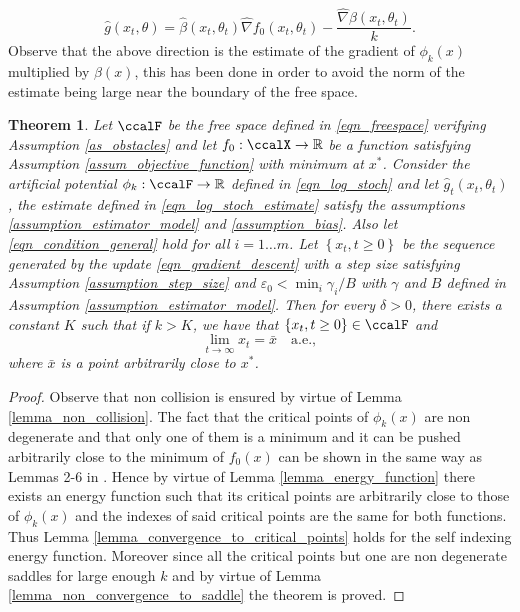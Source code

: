 \documentclass[article]{IEEEtran}
\newtheorem{theorem}{Theorem}
\theoremstyle{definition}
\begin{document}
%
\begin{equation}\label{eqn_log_stoch_estimate}
  \hat{g}(x_t,\theta) = \hat{\beta}(x_t,\theta_t)\hat{\nabla}f_0(x_t,\theta_t) - \frac{\hat{\nabla}\beta(x_t,\theta_t)}{k}.
\end{equation}
Observe that the above direction is the estimate of the gradient of $\phi_k(x)$ multiplied by $\beta(x)$, this has been done in order to avoid the norm of the estimate being large near the boundary of the free space.
\begin{theorem}\label{theo_log}
Let $\ccalF$ be the free space defined in \eqref{eqn_freespace} verifying Assumption \ref{as_obstacles} and let $f_0:\ccalX \to \mathbb{R}$ be a function satisfying Assumption \ref{assum_objective_function} with minimum at $x^*$. Consider the artificial potential $\phi_k:\ccalF\to \mathbb{R}$ defined in \eqref{eqn_log_stoch} and let $\hat{g}_t(x_t,\theta_t)$, the estimate defined in \eqref{eqn_log_stoch_estimate} satisfy the assumptions \ref{assumption_estimator_model} and \ref{assumption_bias}. Also let \eqref{eqn_condition_general} hold for all $i=1\ldots m$. Let $\left\{x_t, t\geq 0\right\}$ be the sequence generated by the update \eqref{eqn_gradient_descent} with a step size satisfying Assumption \ref{assumption_step_size} and $\varepsilon_0 <\min_i \gamma_i/B$ with $\gamma$ and $B$ defined in Assumption \ref{assumption_estimator_model}. Then for every $\delta>0$, there exists a constant $K$ such that if $k>K$, we have that  $\left\{x_t, t\geq0 \right\} \in \ccalF$ and 
%
\begin{equation}
\lim_{t\to \infty} x_t = \bar{x} \quad \mbox{a.e.},
\end{equation}
%
where $\bar{x}$ is a point arbitrarily close to $x^*$. 
\end{theorem}
%
\begin{proof}
  Observe that non collision is ensured by virtue of Lemma \ref{lemma_non_collision}. The fact that the critical points of $\phi_k(x)$ are non degenerate and that only one of them is a minimum and it can be pushed arbitrarily close to the minimum of $f_0(x)$ can be shown in the same way as Lemmas 2-6 in \cite{PaternainEtal15}. Hence by virtue of Lemma \ref{lemma_energy_function} there exists an energy function such that its critical points are arbitrarily close to those of $\phi_k(x)$ and the indexes of said critical points are the same for both functions. Thus Lemma \ref{lemma_convergence_to_critical_points} holds for the self indexing energy function. Moreover since all the critical points but one are non degenerate saddles for large enough $k$ and by virtue of  Lemma \ref{lemma_non_convergence_to_saddle} the theorem is proved.
\end{proof}
\end{document}
